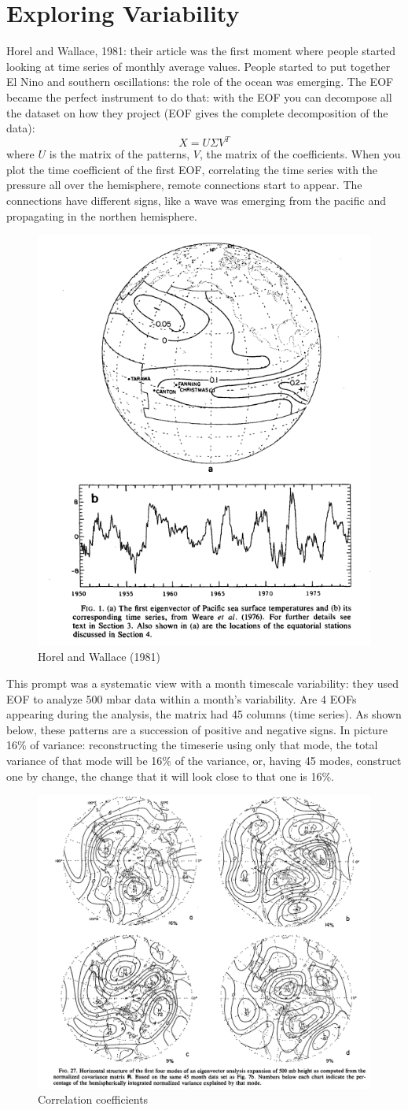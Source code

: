 
\chapter{Exploring Variability}
Horel and Wallace, 1981: their article was the first moment where people started looking at time series of monthly average values. People started to put together El Nino and southern oscillations: the role of the ocean was emerging. The EOF became the perfect instrument to do that: with the EOF you can decompose all the dataset on how they project (EOF gives the complete decomposition of the data):
$$X=U\Sigma V^T$$
where $U$ is the matrix of the patterns, $V$, the matrix of the coefficients. When you plot the time coefficient of the first EOF, correlating the time series with the pressure all over the hemisphere, remote connections start to appear. The connections have different signs, like a wave was emerging from the pacific and propagating in the northen hemisphere.
\begin{figure}[htp!]
	\centering
	\includegraphics[width=0.4\linewidth]{uploads/Screenshot 2024-11-15 154321.png}
	\caption{Horel and Wallace (1981)}
	\label{fig:1981}
\end{figure}
This prompt was a systematic view with a month timescale variability: they used EOF to analyze 500 mbar data within a month's variability. Are 4 EOFs appearing during the analysis, the matrix had 45 columns (time series). As shown below, these patterns are a succession of positive and negative signs. In picture 16\% of variance: reconstructing the timeserie using only that mode, the total variance of that mode will be 16\% of the variance, or, having 45 modes, construct one by change, the change that it will look close to that one is 16\%.
\begin{figure}[htp!]
	\centering
	\includegraphics[width=0.4\linewidth]{uploads/Screenshot 2024-11-15 155150.png}
	\caption{Correlation coefficients}
	\label{fig:correlation coeff}
\end{figure}
